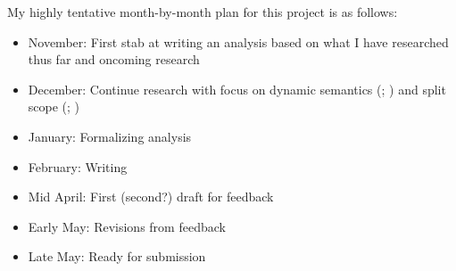 \documentclass[11pt]{article}
\begin{document}
My highly tentative month-by-month plan for this project is as follows:
\begin{itemize}
	\item {November: First stab at writing an analysis based on what I have researched thus far and oncoming research}
	\item {December: Continue research with focus on dynamic semantics (\cite{heimSemanticsDefiniteIndefinite1982}; \cite{groenendijkDynamicPredicateLogic1991}) and split scope (\cite{abelsUnifiedApproachSplit2010}; \cite{bumfordSplitscopeEffectsDefinite2017})}
	\item {January: Formalizing analysis}
	\item {February: Writing}
	\item {Mid April: First (second?) draft for feedback}
	\item {Early May: Revisions from feedback}
	\item {Late May: Ready for submission}
\end{itemize}

\printbibliography
\end{document}
